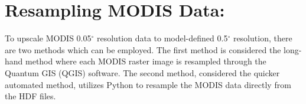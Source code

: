 %
%
%
%
%
\section{Resampling MODIS Data:}
\label{app:modis}
To upscale MODIS 0.05$^{\circ}$ resolution data to model-defined 0.5$^{\circ}$ resolution, there are two methods which can be employed.  
The first method is considered the long-hand method where each MODIS raster image is resampled through the Quantum GIS (QGIS) software\footnotemark.  
The second method, considered the quicker automated method, utilizes Python to resample the MODIS data directly from the HDF files.

